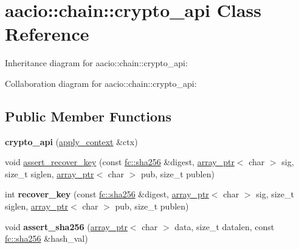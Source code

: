 \hypertarget{classaacio_1_1chain_1_1crypto__api}{}\section{aacio\+:\+:chain\+:\+:crypto\+\_\+api Class Reference}
\label{classaacio_1_1chain_1_1crypto__api}


Inheritance diagram for aacio\+:\+:chain\+:\+:crypto\+\_\+api\+:


Collaboration diagram for aacio\+:\+:chain\+:\+:crypto\+\_\+api\+:
\subsection*{Public Member Functions}
\begin{DoxyCompactItemize}
\item 
\mbox{\label{classaacio_1_1chain_1_1crypto__api_a41fbd2abf150e4aaf7441083bde86902}} 
{\bfseries crypto\+\_\+api} (\mbox{\hyperlink{classaacio_1_1chain_1_1apply__context}{apply\+\_\+context}} \&ctx)
\item 
void \mbox{\hyperlink{classaacio_1_1chain_1_1crypto__api_ac491ec56bcb102b9bd7baa8c1f47073d}{assert\+\_\+recover\+\_\+key}} (const \mbox{\hyperlink{classfc_1_1sha256}{fc\+::sha256}} \&digest, \mbox{\hyperlink{structaacio_1_1chain_1_1array__ptr}{array\+\_\+ptr}}$<$ char $>$ sig, size\+\_\+t siglen, \mbox{\hyperlink{structaacio_1_1chain_1_1array__ptr}{array\+\_\+ptr}}$<$ char $>$ pub, size\+\_\+t publen)
\item 
\mbox{\label{classaacio_1_1chain_1_1crypto__api_a910ceabfeb61943eea5e4f4116a1f8c6}} 
int {\bfseries recover\+\_\+key} (const \mbox{\hyperlink{classfc_1_1sha256}{fc\+::sha256}} \&digest, \mbox{\hyperlink{structaacio_1_1chain_1_1array__ptr}{array\+\_\+ptr}}$<$ char $>$ sig, size\+\_\+t siglen, \mbox{\hyperlink{structaacio_1_1chain_1_1array__ptr}{array\+\_\+ptr}}$<$ char $>$ pub, size\+\_\+t publen)
\item 
\mbox{\label{classaacio_1_1chain_1_1crypto__api_acb89940c1f54c3d3700b400b4a1f16e7}} 
void {\bfseries assert\+\_\+sha256} (\mbox{\hyperlink{structaacio_1_1chain_1_1array__ptr}{array\+\_\+ptr}}$<$ char $>$ data, size\+\_\+t datalen, const \mbox{\hyperlink{classfc_1_1sha256}{fc\+::sha256}} \&hash\+\_\+val)

\end{DoxyCompactItemize}
